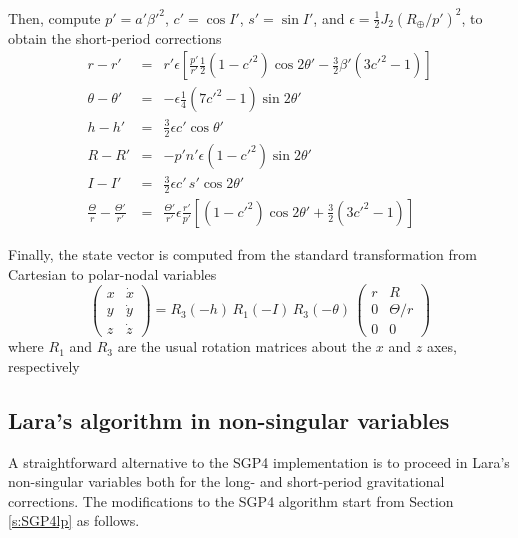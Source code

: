 \documentclass{article}
\begin{document}

Then, compute $p'=a'\beta'^2$, $c'=\cos{I}'$, $s'=\sin{I}'$, and $\epsilon=\frac{1}{2}J_2(R_\oplus/p')^2$, to obtain the short-period corrections
\begin{eqnarray*}
r-r' &=& r'\epsilon\left[\frac{p'}{r'}\frac{1}{2}(1-c'^2)\cos2\theta'-\frac{3}{2}\beta'(3c'^2-1)\right] \\
\theta-\theta' &=& -\epsilon\frac{1}{4}(7c'^2-1)\sin{2\theta'} \\
h-h' &=& \frac{3}{2}\epsilon c'\cos\theta' \\
R-R' &=& -p'n'\epsilon(1-c'^2)\sin2\theta' \\
I-I' &=& \frac{3}{2}\epsilon c'\,s'\cos2\theta' \\
\frac{\Theta}{r}-\frac{\Theta'}{r'} &=& \frac{\Theta'}{r'}
\epsilon\frac{r'}{p'}\left[\left(1-c'^2\right)\cos2\theta'+\frac{3}{2}\left(3c'^2-1\right)\right]
\end{eqnarray*}


Finally, the state vector is computed from the standard transformation from Cartesian to polar-nodal variables
\[ %
\left(\begin{array}{cc} x & \dot{x} \\ y & \dot{y} \\ z & \dot{z} \end{array}\right)=
R_3(-h)\,{R}_1(-I)\,{R}_3(-\theta)\,\left(\begin{array}{cc} r & R \\ 0 & \Theta/r \\ 0 & 0 \end{array}\right)
\] %
where $R_1$ and $R_3$ are the usual rotation matrices about the $x$ and $z$ axes, respectively


\subsection{Lara's algorithm in non-singular variables} \label{sec:lara}

A straightforward alternative to the SGP4 implementation is to proceed in Lara's non-singular variables \cite{Lara2015MPE} both for the long- and short-period gravitational corrections. The modifications to the SGP4 algorithm start from Section \ref{s:SGP4lp} as follows.
\end{document}
